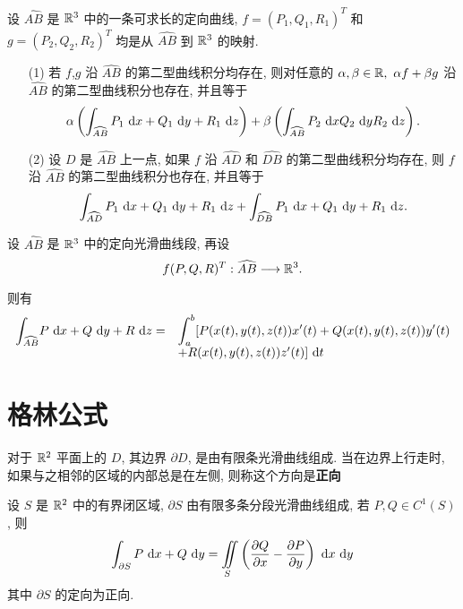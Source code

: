 \begin{proposition}
	设 $\widehat{AB}$ 是 $\R^3$ 中的一条可求长的定向曲线, $f=(P_1,Q_1,R_1)^T$ 和 $g=(P_2,Q_2,R_2)^T$ 均是从 $\widehat{AB}$ 到 $\R^3$ 的映射.
	\begin{itemize}[leftmargin=1.5cm]
		\item[(1)]若 $f$,$g$ 沿 $\widehat{AB}$ 的第二型曲线积分均存在, 则对任意的 $\alpha,\beta\in \R,\ \alpha f+\beta g$ 沿 $\widehat{AB}$ 的第二型曲线积分也存在, 并且等于 $$\alpha\left(\int_{\widehat{AB}} P_1\td x+Q_1\td y+R_1\td z\right)+\beta\left(\int_{\widehat{AB}}P_2\td xQ_2\td yR_2\td z\right).$$
		\item[(2)] 设 $D$ 是 $\widehat{AB}$ 上一点, 如果 $f$ 沿 $\widehat{AD}$ 和 $\widehat{DB}$ 的第二型曲线积分均存在, 则 $f$ 沿 $\widehat{AB}$ 的第二型曲线积分也存在, 并且等于 $$\int_{\widehat{AD}} P_1\td x+Q_1\td y+R_1\td z+\int_{\widehat{DB}} P_1\td x+Q_1\td y+R_1\td z.$$
	\end{itemize}
\end{proposition}


设 $\widehat{AB}$ 是 $\R^3$ 中的定向光滑曲线段, 再设 $$f(P,Q,R)^T:\widehat{AB}\longrightarrow \R^3.$$

则有 $$\begin{array}{rl}
	\mint[\widehat{AB}] P\td x+Q\td y+R\td z=&\mint[a]^b[P(x(t),y(t),z(t))x'(t)+Q(x(t),y(t),z(t))y'(t)\\
	&+R(x(t),y(t),z(t))z'(t)]\td t
\end{array}$$

\section{格林公式}

\begin{definition}\label{正向}
	对于 $\R^2$ 平面上的 $D$, 其边界 $\partial D$, 是由有限条光滑曲线组成. 当在边界上行走时, 如果与之相邻的区域的内部总是在左侧, 则称这个方向是\textbf{正向}
\end{definition}

\begin{theorem}[格林公式]\label{格林公式}
	设 $S$ 是 $\R^2$ 中的有界闭区域, $\partial S$ 由有限多条分段光滑曲线组成, 若 $P,Q\in C^1(S)$, 则
	\begin{equation}\label{格林公式1}
		\int_{\partial S}P\td x+Q\td y = \iint\limits_S\left(\frac{\partial Q}{\partial x}-\frac{\partial P}{\partial y}\right)\td x\td y
	\end{equation}
	其中 $\partial S$ 的定向为正向.
\end{theorem}

